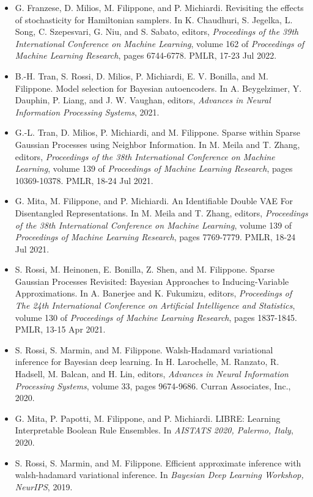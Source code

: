 \begin{itemize}
\item  G. Franzese, D. Milios, M. Filippone, and P. Michiardi. Revisiting the effects of stochasticity for Hamiltonian samplers. In K. Chaudhuri, S. Jegelka, L. Song, C. Szepesvari, G. Niu, and S. Sabato, editors, \emph{Proceedings of the 39th International Conference on Machine Learning}, volume 162 of \emph{Proceedings of Machine Learning Research}, pages 6744-6778. PMLR, 17-23 Jul 2022.  
\item  B.-H. Tran, S. Rossi, D. Milios, P. Michiardi, E. V. Bonilla, and M. Filippone. Model selection for Bayesian autoencoders. In A. Beygelzimer, Y. Dauphin, P. Liang, and J. W. Vaughan, editors, \emph{Advances in Neural Information Processing Systems}, 2021.  
\item  G.-L. Tran, D. Milios, P. Michiardi, and M. Filippone. Sparse within Sparse Gaussian Processes using Neighbor Information. In M. Meila and T. Zhang, editors, \emph{Proceedings of the 38th International Conference on Machine Learning}, volume 139 of \emph{Proceedings of Machine Learning Research}, pages 10369-10378. PMLR, 18-24 Jul 2021.  
\item  G. Mita, M. Filippone, and P. Michiardi. An Identifiable Double VAE For Disentangled Representations. In M. Meila and T. Zhang, editors, \emph{Proceedings of the 38th International Conference on Machine Learning}, volume 139 of \emph{Proceedings of Machine Learning Research}, pages 7769-7779. PMLR, 18-24 Jul 2021.  
\item  S. Rossi, M. Heinonen, E. Bonilla, Z. Shen, and M. Filippone. Sparse Gaussian Processes Revisited: Bayesian Approaches to Inducing-Variable Approximations. In A. Banerjee and K. Fukumizu, editors, \emph{Proceedings of The 24th International Conference on Artificial Intelligence and Statistics}, volume 130 of \emph{Proceedings of Machine Learning Research}, pages 1837-1845. PMLR, 13-15 Apr 2021.  
\item  S. Rossi, S. Marmin, and M. Filippone. Walsh-Hadamard variational inference for Bayesian deep learning. In H. Larochelle, M. Ranzato, R. Hadsell, M. Balcan, and H. Lin, editors, \emph{Advances in Neural Information Processing Systems}, volume 33, pages 9674-9686. Curran Associates, Inc., 2020.  
\item  G. Mita, P. Papotti, M. Filippone, and P. Michiardi. LIBRE: Learning Interpretable Boolean Rule Ensembles. In \emph{AISTATS 2020, Palermo, Italy}, 2020.  
\item  S. Rossi, S. Marmin, and M. Filippone. Efficient approximate inference with walsh-hadamard variational inference. In \emph{Bayesian Deep Learning Workshop, NeurIPS}, 2019.  

\end{itemize}
